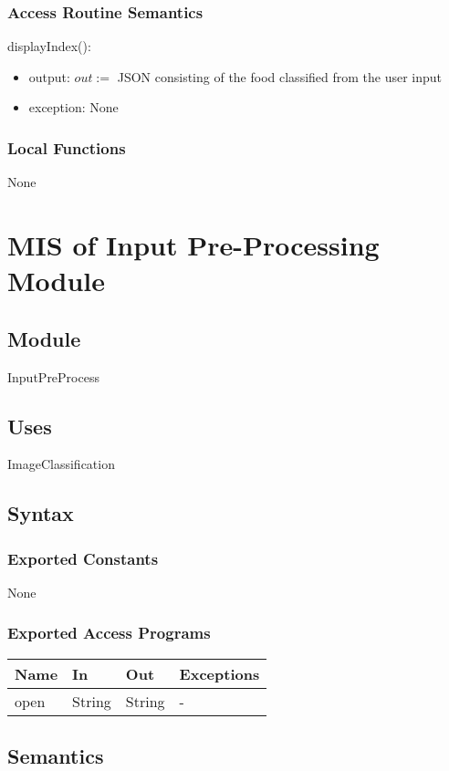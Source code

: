 \documentclass[12pt, titlepage]{article}
\begin{document}
\subsubsection{Access Routine Semantics}
\noindent displayIndex():
\begin{itemize}
	\item output: $out :=$ JSON consisting of the food classified from the user input 
	\item exception: None
\end{itemize}
\subsubsection{Local Functions}
None

\newpage

\section{MIS of Input Pre-Processing Module} \label{InputPreProcess}
\subsection{Module}
InputPreProcess
\subsection{Uses}
ImageClassification
\subsection{Syntax}
\subsubsection{Exported Constants}
None
\subsubsection{Exported Access Programs}
\begin{center}
	\begin{tabular}{p{2cm} p{4cm} p{4cm} p{2cm}}
		\hline
		\textbf{Name} & \textbf{In} & \textbf{Out} & \textbf{Exceptions} \\
		\hline
		open & String & String & - \\
		\hline
	\end{tabular}
\end{center}
\subsection{Semantics}
\end{document}
